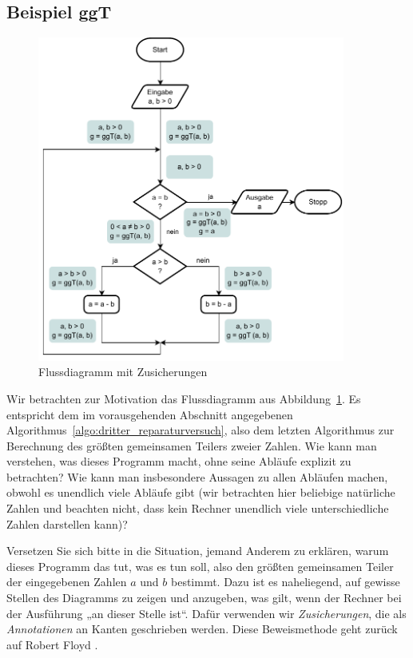 \subsection{Beispiel ggT}
\label{sec:Kap-11-2-1}

\begin{figure}[h!]
	\vspace{\baselineskip} %
	\centering
	\includegraphics[width=0.9\textwidth]{Bilder/Kapitel-11/Flussdiagramm_Algorithmus_Hoare.pdf}
	\caption{Flussdiagramm mit Zusicherungen}
	\label{fig:flussdiagramm_flgorithmus_hoare}
\end{figure}

Wir betrachten zur Motivation das Flussdiagramm aus Abbildung~\ref{fig:flussdiagramm_flgorithmus_hoare}. Es entspricht dem im vorausgehenden Abschnitt angegebenen Algorithmus~\ref{algo:dritter_reparaturversuch}, also dem letzten Algorithmus zur Berechnung des größten gemeinsamen Teilers zweier Zahlen. Wie kann man verstehen, was dieses Programm macht, ohne seine Abläufe explizit zu betrachten? Wie kann man insbesondere Aussagen zu allen Abläufen machen, obwohl es unendlich viele Abläufe gibt (wir betrachten hier beliebige natürliche Zahlen und beachten nicht, dass kein Rechner unendlich viele unterschiedliche Zahlen darstellen kann)?

Versetzen Sie sich bitte in die Situation, jemand Anderem zu erklären, warum dieses Programm das tut, was es tun soll, also den größten gemeinsamen Teiler der eingegebenen Zahlen $a$ und $b$ bestimmt. Dazu ist es naheliegend, auf gewisse Stellen des Diagramms zu zeigen und anzugeben, was gilt, wenn der Rechner bei der Ausführung „an dieser Stelle ist“. Dafür verwenden wir \emph{Zusicherungen}, 
die als \emph{Annotationen} an Kanten geschrieben werden. Diese Beweismethode geht zurück auf Robert Floyd \cite{flo93}.

